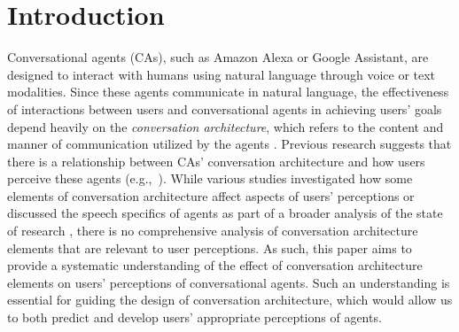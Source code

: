 
\section{Introduction}

Conversational agents (CAs), such as Amazon Alexa or Google Assistant, are designed to interact with humans using natural language through voice or text modalities. Since these agents communicate in natural language, the effectiveness of interactions between users and conversational agents in achieving users' goals depend heavily on the \textit{conversation architecture}, which refers to the content and manner of communication utilized by the agents \mbox{\cite{knijnenburg2016inferring, seeger2021chatbots}}.
Previous research suggests that there is a relationship between CAs' conversation architecture and how users perceive these agents %
(e.g.,~\cite{clark2019state, feine2019taxonomy, finch2020towards}).  
While various studies investigated how some elements of conversation architecture affect aspects of users' perceptions or discussed the speech specifics of agents as part of a broader analysis of the state of research \cite{clark2019state,feine2019taxonomy}, there is no comprehensive analysis of %
conversation architecture elements that are relevant to user perceptions. 
As such, this paper aims to provide a systematic understanding of the effect of conversation architecture elements on users' perceptions of conversational agents. Such an understanding is essential for guiding the design of conversation architecture, which would allow us to both predict and develop users' appropriate perceptions of agents.

